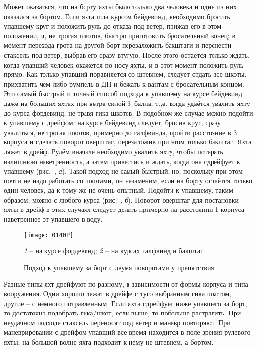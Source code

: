 Может оказаться, что на борту яхты было только два человека и один из них оказался за бортом. Если яхта шла курсом бейдевинд, необходимо бросить упавшему круг и положить руль до отказа под ветер, прижав его в этом положении, и, не трогая шкотов, быстро приготовить бросательный конец; в момент перехода грота на другой борт перезаложить бакштаги и перенести стаксель под ветер, выбрав его сразу втугую. После этого остаётся только ждать, когда упавший человек окажется по носу яхты, и в этот момент положить руль прямо. Как только упавший поравняется со штевнем, следует отдать все шкоты, прихватить чем-либо румпель в ДП и бежать к вантам с бросательным концом. Это самый быстрый и точный способ подхода к упавшему на курсе бейдевинд даже на больших яхтах при ветре силой 3~балла, т.\=,е. когда удаётся увалить яхту до курса фордевинд, не травя гика шкотов. В подобном же случае можно подойти к упавшему с дрейфом: на курсе бейдевинд следует, бросив круг, сразу увалиться, не трогая шкотов, примерно до галфвинда, пройти расстояние в 3 корпуса и сделать поворот оверштаг, перезаложив при этом только бакштаг. Яхта ляжет в дрейф. Рулём вначале необходимо увалить яхту, чтобы потерять излишнюю наветренность, а затем привестись и ждать, когда она сдрейфует к упавшему (рис.~, \textit{а}). Такой подход не самый быстрый, но, поскольку при этом почти не надо работать со шкотами, он незаменим, если на борту остаётся только один человек, да к тому же не очень опытный. Подойти к упавшему, таким образом, можно с любого курса (рис.~, \textit{б}). Поворот оверштаг для постановки яхты в дрейф в этих случаях следует делать примерно на расстоянии 1 корпуса наветреннее от упавшего в воду. 

\begin{figure}[htb]
  \centering{}
  \texttt{[image: 0140P]}
  \caption{Подход к упавшему за борт с двумя поворотами у препятствия}
  \label{fig:140}
  \small
  \centering{}
  \textit{1} \--- на курсе фордевинд; \textit{2} \--- на курсах галфвинд и бакштаг
\end{figure}

Разные типы яхт дрейфуют по-разному, в зависимости от формы корпуса и типа вооружения. Одни хорошо лежат в дрейфе с туго выбранным гика шкотом, другие \--- с немного потравленным. Если яхта сдрейфует ниже упавшего за борт, то достаточно подобрать гика\-/шкот, если выше, то побольше растравить. При неудачном подходе стаксель переносят под ветер и маневр повторяют. При маневрировании с дрейфом упавший все время находится в поле зрения рулевого яхты, на большой волне яхта подходит к нему не штевнем, а бортом.

